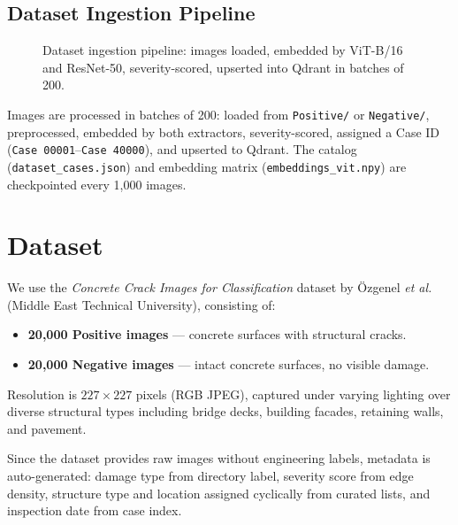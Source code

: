 \documentclass[conference]{IEEEtran}
\begin{document}
\subsection{Dataset Ingestion Pipeline}

\begin{figure}[H]
  \centering
  \caption{Dataset ingestion pipeline: images loaded, embedded by ViT-B/16 and ResNet-50, severity-scored, upserted into Qdrant in batches of 200.}
  \label{fig:pipeline}
\end{figure}

Images are processed in batches of 200: loaded from \texttt{Positive/} or \texttt{Negative/}, preprocessed, embedded by both extractors, severity-scored, assigned a Case ID (\texttt{Case 00001}--\texttt{Case 40000}), and upserted to Qdrant. The catalog (\texttt{dataset\_cases.json}) and embedding matrix (\texttt{embeddings\_vit.npy}) are checkpointed every 1,000 images.

\section{Dataset}

We use the \textit{Concrete Crack Images for Classification} dataset \cite{ref_dataset} by Özgenel \textit{et al.} (Middle East Technical University), consisting of:
\begin{itemize}
  \item \textbf{20,000 Positive images} --- concrete surfaces with structural cracks.
  \item \textbf{20,000 Negative images} --- intact concrete surfaces, no visible damage.
\end{itemize}
Resolution is $227{\times}227$ pixels (RGB JPEG), captured under varying lighting over diverse structural types including bridge decks, building facades, retaining walls, and pavement.

Since the dataset provides raw images without engineering labels, metadata is auto-generated: damage type from directory label, severity score from edge density, structure type and location assigned cyclically from curated lists, and inspection date from case index.
\end{document}
